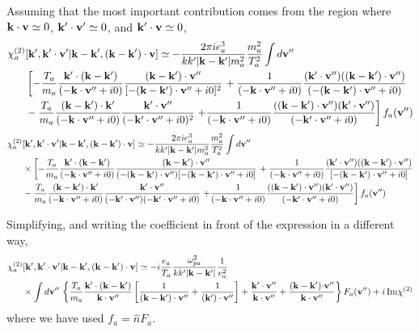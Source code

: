 \documentclass[12pt,a4paper,ruledheader]{report}
\begin{document}
\begin{appendix}
Assuming that the most important contribution comes from the region
where ${\bf k}\cdot {\bf v}\simeq 0$, ${\bf k'}\cdot{\bf v'}\simeq 0$,
and ${\bf k'}\cdot {\bf v}\simeq 0$,
\begin{equation}
\begin{split}
\chi_a^{(2)}&[{\bf k'},{\bf k'\cdot v'}|{\bf k-k'},({\bf k-k'})\cdot{\bf v}]
\simeq-\frac{2\pi ie_a^3}{k k'|{\bf k-k'}|m_a^2}\frac{m_a^2}{T_a^2}\int d{\bf v''}\\
&\left[-\frac{T_a}{m_a}\frac{{\bf k'}\cdot({\bf k-k'})}
{(-{\bf k}\cdot{\bf v''}+i0)}
\frac{({\bf k-k'})\cdot{\bf v''}}
   {[-({\bf k-k'})\cdot{\bf v''}+i0]^2} \right.
   + \frac{1}{(-{\bf k}\cdot{\bf v''}+i0)}
\frac{({\bf k'}\cdot{\bf v''})(({\bf k-k'})\cdot{\bf v''})}
{(-({\bf k-k'})\cdot{\bf v''}+i0)}\\
& -\frac{T_a}{m_a} \frac{({\bf k-k'})\cdot {\bf k'}}{(-{\bf k}\cdot{\bf v''}+i0)}
\frac{{\bf k'}\cdot{\bf v''}}{(-{\bf k'}\cdot{\bf v''}+i0)^2} \left.
+ \frac{1}{(-{\bf k}\cdot{\bf v''}+i0)}\frac{(({\bf k-k'})\cdot{\bf v''})
({\bf k'}\cdot{\bf v''})}{(-{\bf k'}\cdot{\bf v''}+i0)}
\right] f_a({\bf v''})
\end{split}
\end{equation}
\begin{equation}
\begin{split}
\chi_a^{(2)}&[{\bf k'},{\bf k'\cdot v'}|{\bf k-k'},({\bf k-k'})\cdot{\bf v}]
\simeq-\frac{2\pi ie_a^3}{k k'|{\bf k-k'}|m_a^2}\frac{m_a^2}{T_a^2}\int d{\bf v''}\\
&\times \left[-\frac{T_a}{m_a}
  \frac{{\bf k'}\cdot({\bf k-k'})}{(-{\bf k}\cdot{\bf v''}+i0)}
\frac{({\bf k-k'})\cdot{\bf v''}}
{(-({\bf k-k'})\cdot{\bf v''})
[-({\bf k-k'})\cdot{\bf v''}+i0]} \right.
 + \frac{1}{(-{\bf k}\cdot{\bf v''}+i0)}
\frac{({\bf k'}\cdot{\bf v''})(({\bf k-k'})\cdot{\bf v''})}
{[-({\bf k-k'})\cdot{\bf v''}+i0]}\\
&-\frac{T_a}{m_a} \frac{({\bf k-k'})\cdot {\bf k'}}
{(-{\bf k}\cdot{\bf v''}+i0)}
\frac{{\bf k'}\cdot{\bf v''}}
{(-{\bf k'}\cdot{\bf v''})(-{\bf k'}\cdot{\bf v''}+i0)}
\left. + \frac{1}{(-{\bf k}\cdot{\bf v''}+i0)}
\frac{(({\bf k-k'})\cdot{\bf v''})
({\bf k'}\cdot{\bf v''})}
{(-{\bf k'}\cdot{\bf v''}+i0)}
\right] f_a({\bf v''})
\end{split}
\end{equation}

Simplifying, and writing the coefficient in front of the expression in a
different way,
\begin{equation}
\begin{split}
\chi_a^{(2)}&[{\bf k'},{\bf k'\cdot v'}|{\bf k-k'},({\bf k-k'})\cdot{\bf v}]
\simeq-i\frac{e_a}{T_a}\frac{\omega_{pa}^2}{k k'|{\bf k-k'}|}\frac{1}{v_{a}^2}\\
&\times\int d{\bf v''}\,\left\{\frac{T_a}{m_a}
\frac{{\bf k'}\cdot({\bf k-k'})}{{\bf k}\cdot{\bf v''}}
\left[\frac{1}{({\bf k-k'})\cdot{\bf v''}} 
+\frac{1}{({\bf k'})\cdot{\bf v''}}\right] 
+ \frac{\bf k'\cdot v''}{\bf k\cdot v''} 
+ \frac{({\bf k}-{\bf k'}){\bf \cdot v''}}{\bf k\cdot v''} 
\right\} F_a({\bf v''}) + i\,{\rm Im}\chi^{(2)}
\end{split}
\end{equation}
where we have used $f_a= \hat{n} F_a$.


\end{appendix}
\end{document}
